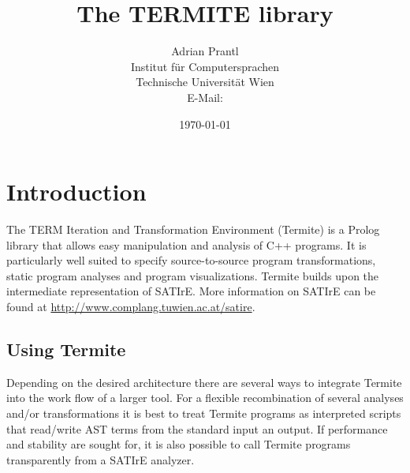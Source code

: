 \documentclass[10pt,twoside]{scrreprt}
\title{The TERMITE library}
\author{Adrian Prantl\\
  Institut f\"{u}r Computersprachen\\
  Technische Universit\"{a}t Wien\\
  E-Mail: \email{adrian@complang.tuwien.ac.at}
}
\date{\today}
\begin{document}
\maketitle

\tableofcontents

\chapter{Introduction}

The TERM Iteration and Transformation Environment (Termite) is a
Prolog library that allows easy manipulation and analysis of C++
programs. It is particularly well suited to specify source-to-source
program transformations, static program analyses and program
visualizations. Termite builds upon the intermediate representation of
SATIrE. More information on SATIrE can be found at
\url{http://www.complang.tuwien.ac.at/satire}.

\section{Using Termite}

Depending on the desired architecture there are several ways to
integrate Termite into the work flow of a larger tool. For a flexible
recombination of several analyses and/or transformations it is best to
treat Termite programs as interpreted scripts that read/write AST
terms from the standard input an output. If performance and stability
are sought for, it is also possible to call Termite programs
transparently from a SATIrE analyzer.
\end{document}
